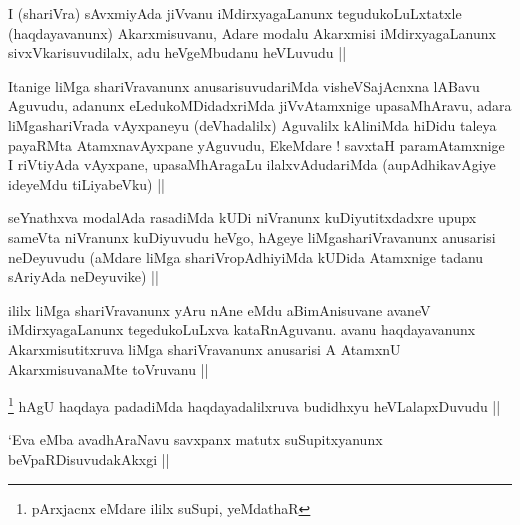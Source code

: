 \begin{artha}
I (shariVra) sAvxmiyAda jiVvanu iMdirxyagaLanunx tegudukoLuLxtatxle
(haqdayavanunx) Akarxmisuvanu, Adare modalu Akarxmisi iMdirxyagaLanunx
sivxVkarisuvudilalx, adu heVgeMbudanu heVLuvudu ||
\end{artha}


\begin{artha}
Itanige liMga shariVravanunx anusarisuvudariMda visheVSajAcnxna lABavu
Aguvudu, adanunx eLedukoMDidadxriMda jiVvAtamxnige upasaMhAravu, adara
liMgashariVrada vAyxpaneyu (deVhadalilx) Aguvalilx kAliniMda hiDidu
taleya payaRMta AtamxnavAyxpane yAguvudu, EkeMdare ! savxtaH
paramAtamxnige I riVtiyAda vAyxpane, upasaMhAragaLu ilalxvAdudariMda
(aupAdhikavAgiye ideyeMdu tiLiyabeVku) ||
\end{artha}


\begin{artha}
seYnathxva modalAda rasadiMda kUDi niVranunx kuDiyutitxdadxre upupx
sameVta niVranunx kuDiyuvudu heVgo, hAgeye liMgashariVravanunx
anusarisi neDeyuvudu (aMdare liMga shariVropAdhiyiMda kUDida Atamxnige
tadanu sAriyAda neDeyuvike) ||
\end{artha}


\begin{artha}
ililx liMga shariVravanunx yAru nAne eMdu aBimAnisuvane avaneV
iMdirxyagaLanunx tegedukoLuLxva kataRnAguvanu. avanu haqdayavanunx
Akarxmisutitxruva liMga shariVravanunx anusarisi A AtamxnU
AkarxmisuvanaMte toVruvanu ||
\end{artha}


\begin{artha}
\footnote{pArxjacnx eMdare ililx suSupi, yeMdathaR}
hAgU haqdaya padadiMda haqdayadalilxruva budidhxyu heVLalapxDuvudu ||
\end{artha}

\begin{artha}
`Eva eMba avadhAraNavu savxpanx matutx suSupitxyanunx
  beVpaRDisuvudakAkxgi ||
\end{artha}


